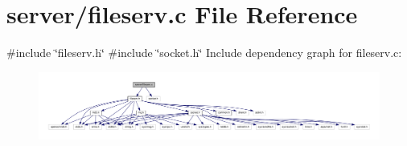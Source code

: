 \section{server/fileserv.c File Reference}
\label{fileserv_8c}
{\ttfamily \#include \char`\"{}fileserv.\+h\char`\"{}}\newline
{\ttfamily \#include \char`\"{}socket.\+h\char`\"{}}\newline
Include dependency graph for fileserv.\+c\+:
\nopagebreak
\begin{figure}[H]
\begin{center}
\leavevmode
\includegraphics[width=350pt]{fileserv_8c__incl}
\end{center}
\end{figure}
